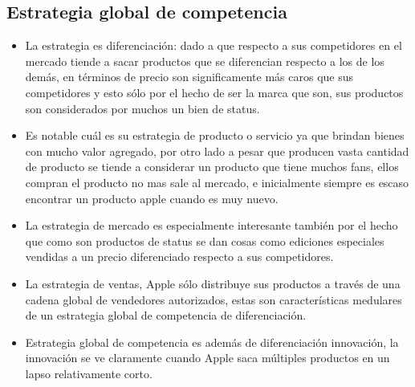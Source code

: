 \documentclass{article}
\begin{document}
\subsection{Estrategia global de competencia}
\begin{itemize}
    \item La estrategia es diferenciación: dado a que respecto a sus competidores en el mercado tiende a sacar productos que se diferencian respecto a los de los demás, en términos de precio son significamente más caros que sus competidores y esto sólo por el hecho de ser la marca que son, sus productos son considerados por muchos un bien de status.
    \item Es notable cuál es su estrategia de producto o servicio ya que brindan bienes con mucho valor agregado, por otro lado a pesar que producen vasta cantidad de producto se tiende a considerar un producto que tiene muchos fans, ellos compran el producto no mas sale al mercado, e inicialmente siempre es escaso encontrar un producto apple cuando es muy nuevo.
    \item La estrategia de mercado es especialmente interesante también por el hecho que como son productos de status se dan cosas como ediciones especiales vendidas a un precio diferenciado respecto a sus competidores.
    \item La estrategia de ventas, Apple sólo distribuye sus productos a través de una cadena global de vendedores autorizados, estas son características medulares de un estrategia global de competencia de diferenciación.
    \item Estrategia global de competencia es además de diferenciación innovación, la innovación se ve claramente cuando Apple saca múltiples productos en un lapso relativamente corto.
\end{itemize}



\end{document}
